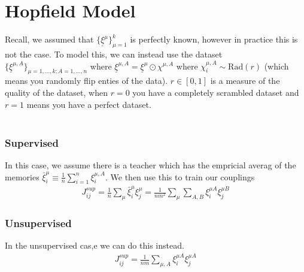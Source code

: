 \section{Hopfield Model}
Recall, we assumed that $\{\underline \xi^\mu\}_{\mu=1}^k$ is perfectly known, however in practice this is not the case. To model this, we can instead use the dataset $\{\underline \xi^{\mu, A}\}_{\mu = 1, ..., k; A = 1,..., n}$ where $\underline \xi^{\mu, A} = \underline \xi^\mu \odot \chi^{\mu, A}$ where $\chi^{\mu, A}_i \sim \text{Rad}(r)$ (which means you randomly flip enties of the data). $r \in [0,1]$ is a measure of the quality of the dataset, when $r = 0$ you have a completely scrambled dataset and $r = 1$ means you have a perfect dataset.\\
\\
\subsubsection{Supervised} In this case, we assume there is a teacher which has the empricial averag of the memories $\bar \xi_i^\mu \equiv \frac{1}{n}\sum^n_{i=1} \xi_i^{\mu, A}$. We then use this to train our couplings
\begin{align}
	J_{ij}^{sup} = \frac{1}{n} \sum_\mu \bar \xi_i^\mu \xi_j^\mu = \frac{1}{nm^2 } \sum_{\mu} \sum_{A,B} \xi_i^{\mu A} \xi_{j}^{\mu B}
\end{align}

\subsubsection{Unsupervised}  In the unsupervised cas,e we can do this instead.
\begin{align}
	J^{sup}_{ij} = \frac{1}{nm} \sum_{\mu, A} \xi_i^{\mu A} \xi_j^{\mu A}
\end{align}




















